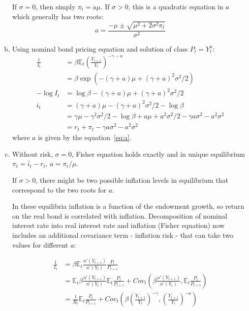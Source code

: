 \documentclass{article}
\newcommand{\E}{\mathbb{E}}
\begin{document}
\begin{enumerate}[(a)]
  If $\sigma=0$, then simply $\pi_t=a\mu$. If $\sigma>0$, this is a
  quadratic equation in $a$ which generally has two roots:
  \begin{equation}\label{eq:a}
    a=\frac{-\mu\pm\sqrt{\mu^2+2\sigma^2\pi_t}}{\sigma^2}
  \end{equation}

\item Using nominal bond pricing equation and solution of class
  $P_t=Y_t^a$:
  \begin{align*}
    \frac{1}{I_t}&=\beta\E_t\left(\frac{Y_{t+1}}{Y_t}\right)^{-\gamma-a}\\
                 &=\beta\exp(-(\gamma+a)\mu+(\gamma+a)^2\sigma^2/2)\\
-\log I_t&=\log\beta-(\gamma+a)\mu+(\gamma+a)^2\sigma^2/2\\
    i_t&=(\gamma+a)\mu-(\gamma+a)^2\sigma^2/2-\log\beta\\
                 &=\gamma\mu-\gamma^2\sigma^2/2-\log\beta
                   +a\mu+a^2\sigma^2/2-\gamma a \sigma^2 - a^2\sigma^2\\
                 &=r_t+\pi_t-\gamma a \sigma^2 - a^2\sigma^2
  \end{align*}
  where $a$ is given by the equation~\eqref{eq:a}.

\item Without risk, $\sigma=0$, Fisher equation holds exactly and in
  unique equilibrium $\pi_t=\bar{i}_t-r_t$, $a=\pi_t/\mu$.

  If $\sigma>0$, there might be two possible inflation levels in
  equilibrium that correspond to the two roots for $a$.

  In these equilibria inflation is a function of the endowment growth,
  so return on the real bond is correlated with
  inflation. Decomposition of nominal interest rate into real interest
  rate and inflation (Fisher equation) now includes an additional
  covariance term - inflation risk - that can take two values for different $a$:

  \begin{align*}
    \frac{1}{I_t}&=\beta\E_t\frac{u'(Y_{t+1})}{u'(Y_t)}\frac{P_t}{P_{t+1}}\\
                 &=\E_t\beta\frac{u'(Y_{t+1})}{u'(Y_t)}\E_t\frac{P_t}{P_{t+1}}+Cov_t\left(\beta\frac{u'(Y_{t+1})}{u'(Y_t)},\E_t\frac{P_t}{P_{t+1}}\right)\\
                 &=\frac{1}{R_t}\E_t\frac{P_t}{P_{t+1}}+Cov_t\left(\beta\left(\frac{Y_{t+1}}{Y_t}\right)^{-\gamma},\left(\frac{Y_{t+1}}{Y_t}\right)^{-a}\right)
  \end{align*}

\end{enumerate}
\end{document}
